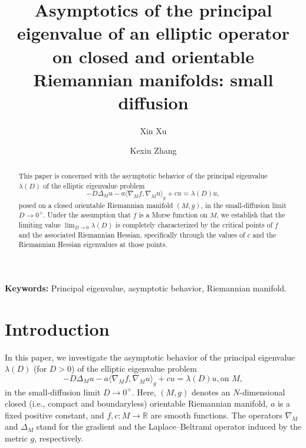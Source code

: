 \documentclass[12pt,reqno]{amsart}
\numberwithin{equation}{section}
\begin{document}
\author{Xin Xu}
\address{Xin Xu, School of Mathematical Sciences, South China Normal University, Guangdong 510631, China.}

\author{Kexin Zhang}
\address{Kexin Zhang, School of Mathematics, Sun Yat-sen University, Guangzhou 510275, China.}

\title
{Asymptotics of the principal eigenvalue of an elliptic operator on closed and orientable  Riemannian manifolds: small diffusion}
\date{}
\maketitle

\begin{abstract}
This paper is concerned with the asymptotic behavior of the principal eigenvalue $\lambda(D)$ of the elliptic eigenvalue problem
\[
-D\Delta_{M}u - a\langle \nabla_M f, \nabla_M u\rangle_g + c u = \lambda(D)u,
\]
posed on a closed orientable Riemannian manifold $(M,g)$, in the small-diffusion limit $D \to 0^+$. Under the assumption that $f$ is a Morse function on $M$, we establish that the limiting value $\lim_{D\to 0}\lambda(D)$ is completely characterized by the critical points of $f$ and the associated Riemannian Hessian, specifically through the values of $c$ and the  Riemannian Hessian eigenvalues at those points.
\end{abstract}

\noindent \textbf{Keywords:} Principal eigenvalue, asymptotic behavior,  Riemannian manifold.
\vskip20pt

\section{Introduction}

In this paper, we investigate the asymptotic behavior of the principal eigenvalue $\lambda(D)$ (for $D>0$) of the elliptic eigenvalue problem
 \begin{equation}\label{E}
  -D\Delta_{M}u-a\langle  \nabla_M f, \nabla_M u\rangle_g +c u=\lambda(D)u, \text{on } M, 
\end{equation}
in the small-diffusion limit $D \to 0^+$. Here, $(M,g)$ denotes an $N$-dimensional closed (i.e., compact and boundaryless) orientable Riemannian manifold, $a$ is a fixed positive constant, and $f, c: M \to \mathbb{R}$ are smooth functions. The operators $\nabla_M$ and $\Delta_M$ stand for the gradient and the Laplace--Beltrami operator induced by the metric $g$, respectively.
\end{document}
